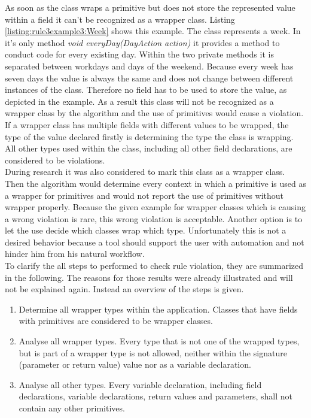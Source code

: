 As soon as the class wraps a primitive but does not store the represented value within a field it can't be recognized as a wrapper class. Listing \ref{listing:rule3example3:Week} shows this example. The class represents a week. In it's only method \textit{void everyDay(DayAction action)} it provides a method to conduct code for every existing day. Within the two private methods it is separated between workdays and days of the weekend. Because every week has seven days the value is always the same and does not change between different instances of the class. Therefore no field has to be used to store the value, as depicted in the example. As a result this class will not be recognized as a wrapper class by the algorithm and the use of primitives would cause a violation. 
\\

If a wrapper class has multiple fields with different values to be wrapped, the type of the value declared firstly is determining the type the class is wrapping. All other types used within the class, including all other field declarations, are considered to be violations. 
\\

During research it was also considered to mark this class as a wrapper class. Then the algorithm would determine every context in which a primitive is used as a wrapper for primitives and would not report the use of primitives without wrapper properly. Because the given example for wrapper classes which is causing a wrong violation is rare, this wrong violation is acceptable. Another option is to let the use decide which classes wrap which type. Unfortunately this is not a desired behavior because a tool should support the user with automation and not hinder him from his natural workflow. 
\\

To clarify the all steps to performed to check rule violation, they are summarized in the following. The reasons for those results were already illustrated and will not be explained again. Instead an overview of the steps is given.
\begin{enumerate}
  \item Determine all wrapper types within the application. Classes that have fields with primitives are considered to be wrapper classes.
  \item Analyse all wrapper types. Every type that is not one of the wrapped types, but is part of a wrapper type is not allowed, neither within the signature (parameter or return value) value nor as a variable declaration.
  \item Analyse all other types. Every variable declaration, including field declarations, variable declarations, return values and parameters, shall not contain any other primitives. 
\end{enumerate}

